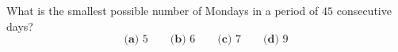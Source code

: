 What is the smallest possible number of Mondays in a period of $45$ consecutive days?
\[
\textbf{(a) } 5\qquad\textbf{(b) } 6\qquad\textbf{(c) } 7\qquad\textbf{(d) } 9
\]
